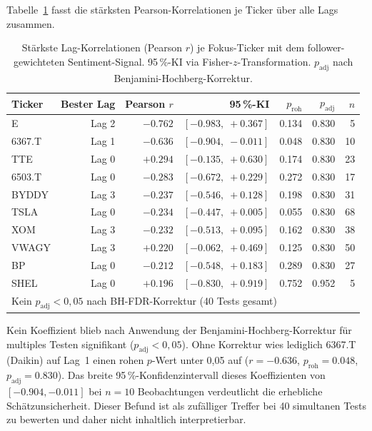 Tabelle~\ref{tab:lag_corr} fasst die stärksten Pearson-Korrelationen je Ticker über alle Lags zusammen.

\begin{table}[H]
\centering
\caption{Stärkste Lag-Korrelationen (Pearson $r$) je Fokus-Ticker mit dem follower-gewichteten Sentiment-Signal. 95\,\%-KI via Fisher-$z$-Transformation. $p_{\mathrm{adj}}$ nach Benjamini-Hochberg-Korrektur.}
\label{tab:lag_corr}
\begin{tabular}{lrrrrrr}
\toprule
\textbf{Ticker} & \textbf{Bester Lag} & \textbf{Pearson $r$} & \textbf{95\,\%-KI} & \textbf{$p_{\mathrm{roh}}$} & \textbf{$p_{\mathrm{adj}}$} & \textbf{$n$} \\
\midrule
E        & Lag 2 & $-0.762$ & $[-0.983,\;+0.367]$ & 0.134 & 0.830 & 5  \\
6367.T   & Lag 1 & $-0.636$ & $[-0.904,\;-0.011]$ & 0.048 & 0.830 & 10 \\
TTE      & Lag 0 & $+0.294$ & $[-0.135,\;+0.630]$ & 0.174 & 0.830 & 23 \\
6503.T   & Lag 0 & $-0.283$ & $[-0.672,\;+0.229]$ & 0.272 & 0.830 & 17 \\
BYDDY    & Lag 3 & $-0.237$ & $[-0.546,\;+0.128]$ & 0.198 & 0.830 & 31 \\
TSLA     & Lag 0 & $-0.234$ & $[-0.447,\;+0.005]$ & 0.055 & 0.830 & 68 \\
XOM      & Lag 3 & $-0.232$ & $[-0.513,\;+0.095]$ & 0.162 & 0.830 & 38 \\
VWAGY    & Lag 3 & $+0.220$ & $[-0.062,\;+0.469]$ & 0.125 & 0.830 & 50 \\
BP       & Lag 0 & $-0.212$ & $[-0.548,\;+0.183]$ & 0.289 & 0.830 & 27 \\
SHEL     & Lag 0 & $+0.196$ & $[-0.830,\;+0.919]$ & 0.752 & 0.952 &  5 \\
\bottomrule
\multicolumn{7}{l}{\footnotesize Kein $p_{\mathrm{adj}} < 0{,}05$ nach BH-FDR-Korrektur (40 Tests gesamt)}
\end{tabular}
\end{table}

Kein Koeffizient blieb nach Anwendung der Benjamini-Hochberg-Korrektur für multiples Testen signifikant ($p_{\mathrm{adj}} < 0{,}05$). Ohne Korrektur wies lediglich 6367.T\,(Daikin) auf Lag~1 einen rohen $p$-Wert unter 0,05 auf ($r = -0.636$, $p_{\mathrm{roh}} = 0.048$, $p_{\mathrm{adj}} = 0.830$). Das breite 95\,\%-Konfidenzintervall dieses Koeffizienten von $[-0.904, -0.011]$ bei $n = 10$ Beobachtungen verdeutlicht die erhebliche Schätzunsicherheit. Dieser Befund ist als zufälliger Treffer bei 40 simultanen Tests zu bewerten und daher nicht inhaltlich interpretierbar.

